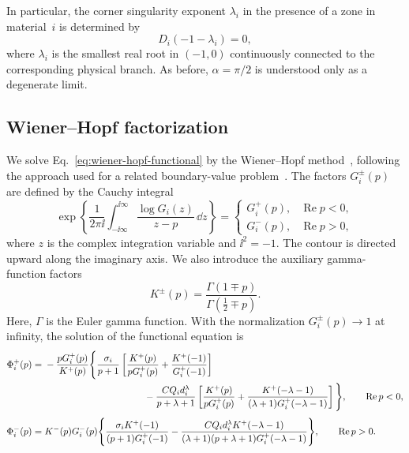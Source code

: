 In particular, the corner singularity exponent $\lambda_i$ in the
presence of a zone in material~$i$ is determined by
\begin{equation*}
  D_i(-1-\lambda_i)=0,
\end{equation*}
where $\lambda_i$ is the smallest real root in $(-1,0)$ continuously
connected to the corresponding physical branch. As before,
$\alpha=\pi/2$ is understood only as a degenerate limit.

\subsection{Wiener--Hopf factorization}
\label{subsec:wiener-hopf}

We solve Eq.~\eqref{eq:wiener-hopf-functional} by the Wiener--Hopf
method~\cite{noble1958wienerhopf}, following the approach used for a related
boundary-value problem~\cite{KaminskyDudykPolishchuk2024}.
The factors $G_i^\pm(p)$ are defined by the Cauchy integral
\begin{equation*}
  \exp\left\{
    \frac{1}{2\pi\ii}
    \int_{-\ii\infty}^{\ii\infty}
      \frac{\log G_i(z)}{z-p}\,\dd z
  \right\}
  =
  \begin{cases}
    G_i^+(p), & \operatorname{Re}p<0,\\
    G_i^-(p), & \operatorname{Re}p>0,
  \end{cases}
\end{equation*}
where $z$ is the complex integration variable and $\ii^2=-1$.
The contour is directed upward along the imaginary axis. We also introduce
the auxiliary gamma-function factors
\begin{equation*}
  K^\pm(p)=
  \frac{\Gamma(1\mp p)}{\Gamma(\tfrac12\mp p)}.
\end{equation*}
Here, $\Gamma$ is the Euler gamma function.
With the normalization $G_i^\pm(p)\to1$ at infinity, the solution of
the functional equation is
\begin{equation}
\label{eq:wiener-hopf-solution}
\begin{aligned}
  \Phi_i^+(p)={}&
  -\frac{pG_i^+(p)}{K^+(p)}
  \Bigg\{
    \frac{\sigma_i}{p+1}
    \left[
      \frac{K^+(p)}{pG_i^+(p)}
      +\frac{K^+(-1)}{G_i^+(-1)}
    \right]\\
  &\hspace{37mm}
    -\frac{CQ_i d_i^\lambda}{p+\lambda+1}
    \left[
      \frac{K^+(p)}{pG_i^+(p)}
      +\frac{K^+(-\lambda-1)}
      {(\lambda+1)G_i^+(-\lambda-1)}
    \right]
  \Bigg\},
  \qquad \operatorname{Re}p<0,\\[3pt]
  \Phi_i^-(p)={}&
  K^-(p)G_i^-(p)
  \Bigg\{
    \frac{\sigma_iK^+(-1)}{(p+1)G_i^+(-1)}
    -\frac{CQ_i d_i^\lambda K^+(-\lambda-1)}
    {(\lambda+1)(p+\lambda+1)G_i^+(-\lambda-1)}
  \Bigg\},
  \qquad \operatorname{Re}p>0.
\end{aligned}
\end{equation}
